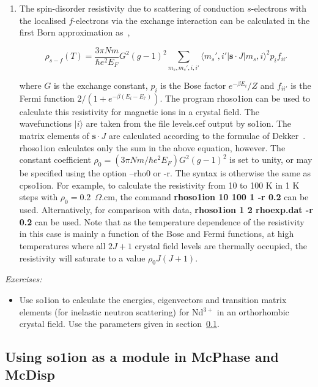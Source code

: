 \begin{enumerate}
\item The spin-disorder resistivity due to scattering of conduction $s$-electrons with the localised
$f$-electrons via the exchange interaction can be calculated in the first Born approximation as~\cite{raowallace},

\begin{equation} \label{eq:cfres}
\rho_{s-f}(T) = \frac{3\pi N m}{\hbar e^2 E_F} G^2(g-1)^2 \sum_{m_s,m_s',i,i'} 
      \langle m_s',i' | {\mathbf s \cdot J} | m_s, i \rangle^2 p_i f_{ii'}
\end{equation}

\noindent where $G$ is the exchange constant, $p_i$ is the Bose factor $e^{-\beta E_i}/Z$ and $f_{ii'}$ is the
Fermi function $2/(1+e^{-\beta(E_i-E_{i'})})$. The program {\prg rhoso1ion} can be used to calculate this
resistivity for magnetic ions in a crystal field. The wavefunctions $|i\rangle$ are taken from the file {\prg
levels.cef} output by {\prg so1ion}. The matrix elements of ${\mathbf s \cdot J}$ are calculated according to
the formulae of Dekker~\cite{dekker}. {\prg rhoso1ion} calculates only the sum in the above equation, however.
The constant coefficient $\rho_0=(3\pi N m/\hbar e^2 E_F) G^2(g-1)^2$ is set to unity, or may be specified using
the option {\prg --rho0} or {\prg -r}. The syntax is otherwise the same as {\prg cpso1ion}. For example, to
calculate the resistivity from 10 to 100 K in 1 K steps with $\rho_0 = 0.2$~$\Omega$.cm, the command {\bf
rhoso1ion 10 100 1 -r 0.2} can be used. Alternatively, for comparison with data, {\bf rhoso1ion 1 2 rhoexp.dat
-r 0.2} can be used. Note that as the temperature dependence of the resistivity in this case is mainly a
function of the Bose and Fermi functions, at high temperatures where all $2J+1$ crystal field levels are
thermally occupied, the resistivity will saturate to a value $\rho_0 J(J+1)$.

\end{enumerate}

\vspace{1cm}
{\em Exercises:}
\begin{itemize}
\item Use {\prg so1ion} to calculate the energies, eigenvectors and
transition matrix elements (for inelastic
neutron scattering) for Nd$^{3+}$ in an orthorhombic crystal field.
Use the parameters given in section~\ref{cf1ion}.
\end{itemize}



\subsection{Using {\prg so1ion} as a module in {\prg McPhase} and {\prg McDisp}}
\label{cf1ion}


